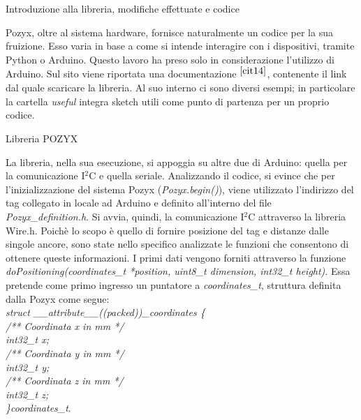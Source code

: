 \documentclass[12pt]{report}
\begin{document}
	\begin{section}{Introduzione alla libreria, modifiche effettuate e codice}
	
		Pozyx, oltre al sistema hardware, fornisce naturalmente un codice per la sua fruizione. Esso varia in base a come si intende interagire con i dispositivi, tramite Python o Arduino. Questo lavoro ha preso solo in considerazione l'utilizzo di Arduino. Sul sito viene riportata una documentazione													$^{{\cite{cit14}}}$, contenente il link dal quale scaricare la libreria. Al suo interno ci sono diversi esempi; in particolare la cartella \textit{useful} integra sketch utili come punto di partenza per un proprio codice.

		\begin{subsection}{Libreria POZYX}

			La libreria, nella sua esecuzione, si appoggia su altre due di Arduino: quella per la comunicazione I$^2$C e quella seriale. Analizzando il codice, si evince che per l'inizializzazione del sistema Pozyx (\textit{Pozyx.begin()}), viene utilizzato l’indirizzo del tag collegato in locale ad Arduino e definito 											all’interno del file \textit{Pozyx\_definition.h}. Si avvia, quindi, la comunicazione I$^2$C attraverso la libreria Wire.h. 
			Poichè lo scopo è quello di fornire posizione del tag e distanze dalle singole ancore, sono state nello specifico analizzate le funzioni che consentono di ottenere queste informazioni. 
			I primi dati vengono forniti attraverso la funzione \textit{doPositioning(coordinates\_t *position, uint8\_t dimension, int32\_t height)}. Essa pretende come primo ingresso un puntatore a \textit{coordinates\_t}, struttura definita dalla Pozyx come segue:\\
			\textit{struct \_\_attribute\_\_((packed))\_coordinates \{\\
    		/** Coordinata x in mm */\\
   			int32\_t x;\\
    		/** Coordinata y in mm */\\
   			int32\_t y;\\
   			 /** Coordinata z in mm */\\
  			int32\_t z;\\
			\}coordinates\_t}.\\


\end{subsection}
\end{section}
\end{document}
